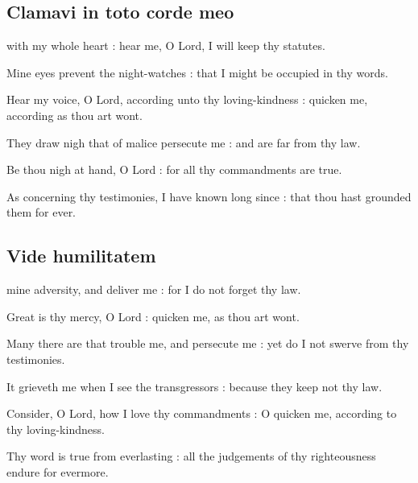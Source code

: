 \subsection{Clamavi in toto corde meo}
 with my whole heart : hear me, O Lord, I will keep thy statutes.\par
{}
Mine eyes prevent the night-watches : that I might be occupied in thy words.\par
{}Hear my voice, O Lord, according unto thy loving-kindness : quicken me, according as thou art wont.\par
{}They draw nigh that of malice persecute me : and are far from thy law.\par
{}Be thou nigh at hand, O Lord : for all thy commandments are true.\par
{}As concerning thy testimonies, I have known long since : that thou hast grounded them for ever.\par

\subsection{Vide humilitatem}
 mine adversity, and deliver me : for I do not forget thy law.\par
{}
Great is thy mercy, O Lord : quicken me, as thou art wont.\par
{}Many there are that trouble me, and persecute me : yet do I not swerve from thy testimonies.\par
{}It grieveth me when I see the transgressors : because they keep not thy law.\par
{}Consider, O Lord, how I love thy commandments : O quicken me, according to thy loving-kindness.\par
{}Thy word is true from everlasting : all the judgements of thy righteousness endure for evermore.\par

\clearpage
